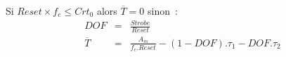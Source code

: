 Si $Reset\times f_e \le Crt_0$ alors $\overline{T} = 0$ sinon~:
\begin{eqnarray*}
DOF & = & \frac{Strobe}{Reset} \\
\overline{T} & = & \frac{A_m}{f_e.Reset} - (1 - DOF).\tau_1 - DOF. \tau_2
\end{eqnarray*}
